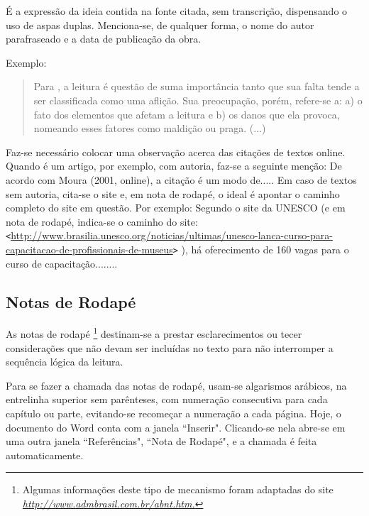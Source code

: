 \documentclass[
	12pt,				%
	openright,			%
	oneside,			%
	a4paper,			%
	english,			%
	french,				%
	spanish,			%
	brazil				%
	]{abntex2}
\begin{document}
\par É a expressão da ideia contida na fonte citada, sem transcrição, dispensando o uso de aspas duplas. Menciona-se, de qualquer forma, o nome do autor parafraseado e a data de publicação da obra. 

\par Exemplo:

\begin{quote}
\par Para , a leitura é questão de suma importância tanto que sua falta tende a ser classificada como uma aflição. Sua preocupação, porém, refere-se a: a) o fato dos elementos que afetam a leitura e b) os danos que ela provoca, nomeando esses fatores como maldição ou praga. (...)
\end{quote}

\par Faz-se necessário colocar uma observação acerca das citações de textos online. Quando é um artigo, por exemplo, com autoria, faz-se a seguinte menção: De acordo com Moura (2001, online), a citação é um modo de..... Em caso de textos sem autoria, cita-se o site e, em nota de rodapé, o ideal é apontar o caminho completo do site em questão. Por exemplo: Segundo o site da UNESCO (e em nota de rodapé, indica-se o caminho do site: \verb*#<#\url{http://www.brasilia.unesco.org/noticias/ultimas/unesco-lanca-curso-para-capacitacao-de-profissionais-de-museus}\verb*#># ), há oferecimento de 160 vagas para o curso de capacitação........

\subsection{Notas de Rodapé}

\par As notas de rodapé \protect\footnote{Algumas informações deste tipo de mecanismo foram adaptadas do site \textit{\protect {}\url{http://www.admbrasil.com.br/abnt.htm.}}} destinam-se a prestar esclarecimentos ou tecer considerações que não devam ser incluídas no texto para não interromper a sequência lógica da leitura. 

\par Para se fazer a chamada das notas de rodapé, usam-se algarismos arábicos, na entrelinha superior sem parênteses, com numeração consecutiva para cada capítulo ou parte, evitando-se recomeçar a numeração a cada página. Hoje, o documento do Word conta com a janela ``Inserir". Clicando-se nela abre-se em uma outra janela ``Referências", ``Nota de Rodapé", e a chamada é feita automaticamente.
\end{document}
